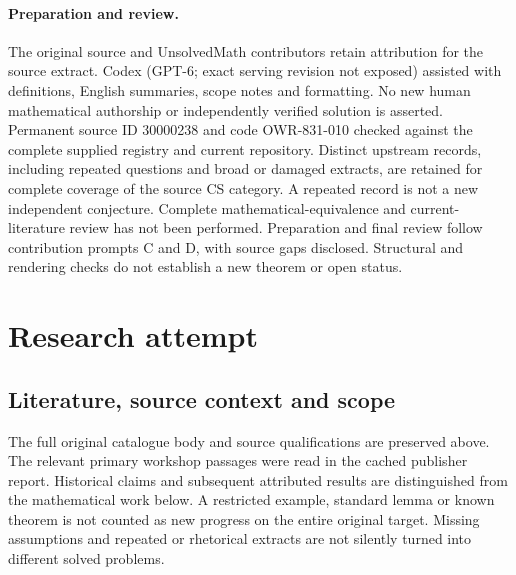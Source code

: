 \documentclass[11pt]{article}
\begin{document}
\paragraph{Preparation and review.}
The original source and UnsolvedMath contributors retain attribution for the source extract. Codex (GPT-6; exact serving revision not exposed) assisted with definitions, English summaries, scope notes and formatting. No new human mathematical authorship or independently verified solution is asserted. Permanent source ID 30000238 and code OWR-831-010 checked against the complete supplied registry and current repository. Distinct upstream records, including repeated questions and broad or damaged extracts, are retained for complete coverage of the source CS category. A repeated record is not a new independent conjecture. Complete mathematical-equivalence and current-literature review has not been performed. Preparation and final review follow contribution prompts C and D, with source gaps disclosed. Structural and rendering checks do not establish a new theorem or open status.
\label{end:30000238}

\section{Research attempt}
\subsection{Literature, source context and scope}
The full original catalogue body and source qualifications are preserved above. The relevant primary workshop passages were read in the cached publisher report. Historical claims and subsequent attributed results are distinguished from the mathematical work below. A restricted example, standard lemma or known theorem is not counted as new progress on the entire original target. Missing assumptions and repeated or rhetorical extracts are not silently turned into different solved problems.
\end{document}
